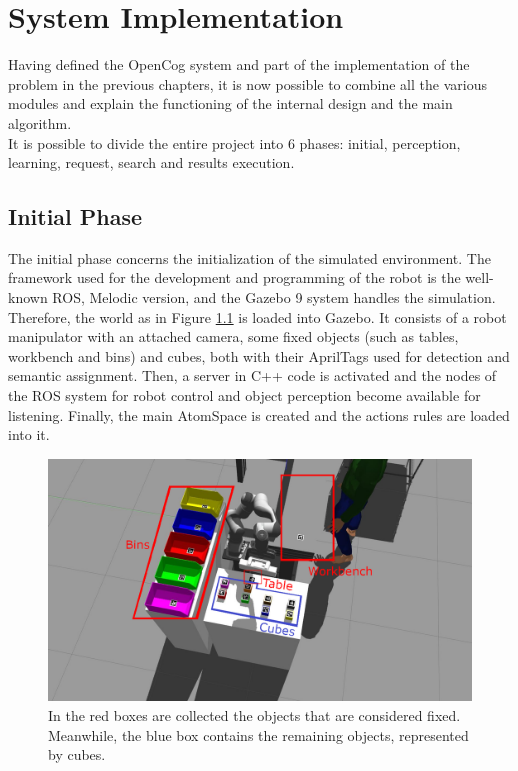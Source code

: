 
\chapter{System Implementation} \label{cha:algorithm}

Having defined the OpenCog system and part of the implementation of the problem in the previous chapters, it is now possible to combine all the various modules and explain the functioning of the internal design and the main algorithm. \\

It is possible to divide the entire project into 6 phases: initial, perception, learning, request, search and results execution.  

\section{Initial Phase}\label{sec:init}

The initial phase concerns the initialization of the simulated environment. The framework used for the development and programming of the robot is the well-known ROS, Melodic version, and the Gazebo 9 system handles the simulation. 
Therefore, the world as in Figure \ref{fig:env_2_named} is loaded into Gazebo. 
It consists of a robot manipulator with an attached camera, some fixed objects (such as tables, workbench and bins) and cubes, both with their AprilTags used for detection and semantic assignment. 
Then, a server in C++ code is activated and the nodes of the ROS system for robot control and object perception become available for listening. 
Finally, the main AtomSpace is created and the actions rules are loaded into it. 

\begin{figure} [h]
\centering
\includegraphics[width=1.0
\textwidth]{figures/Magistrale/env_objs}
\caption[Environment Components Description]{ In the red boxes are collected the objects that are considered fixed. Meanwhile, the blue box contains the remaining objects, represented by cubes.
\label{fig:env_2_named}}
\end{figure} 

